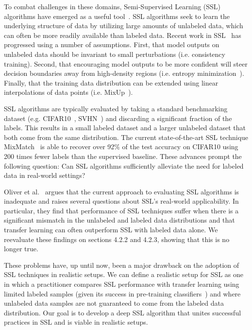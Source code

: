 \documentclass[10pt,twocolumn,letterpaper]{article}
\begin{document}
To combat challenges in these domains, Semi-Supervised Learning (SSL) algorithms have emerged as a useful tool~\cite{introsslChapelle}. SSL algorithms seek to learn the underlying structure of data by utilizing large amounts of unlabeled data, which can often be more readily available than labeled data. Recent work in SSL~\cite{mixmatchBerthelot, vatMiyato, meanteacherTarvainen, ictVerma} has progressed using a number of assumptions. First, that model outputs on unlabeled data should be invariant to small perturbations (i.e. consistency training). Second, that encouraging model outputs to be more confident will steer decision boundaries away from high-density regions (i.e. entropy minimization~\cite{entropyminsslGrandvalet}). Finally, that the training data distribution can be extended using linear interpolations of data points (i.e. MixUp~\cite{mixupZhang}).

SSL algorithms are typically evaluated by taking a standard benchmarking dataset (e.g. CIFAR10~\cite{cifar10krizhevsky}, SVHN~\cite{svhnNetzer}) and discarding a significant fraction of the labels. This results in a small labeled dataset and a larger unlabeled dataset that both come from the same distribution. The current state-of-the-art SSL technique MixMatch~\cite{mixmatchBerthelot} is able to recover over 92\% of the test accuracy on CIFAR10 using 200 times fewer labels than the supervised baseline. These advances prompt the following question: Can SSL algorithms sufficiently alleviate the need for labeled data in real-world settings?

Oliver et al.~\cite{realisticevalOliver} argues that the current approach to evaluating SSL algorithms is inadequate and raises several questions about SSL's real-world applicability. In particular, they find that performance of SSL techniques suffer when there is a significant mismatch in the unlabeled and labeled data distributions and that transfer learning can often outperform SSL with labeled data alone. We reevaluate these findings on sections 4.2.2 and 4.2.3, showing that this is no longer true.

These problems have, up until now, been a major drawback on the adoption of SSL techniques in realistic setups. We can define a realistic setup for SSL as one in which a practitioner compares SSL performance with transfer learning using limited labeled samples (given its success in pre-training classifiers~\cite{transferlearningBengio}) and where unlabeled data samples are not guaranteed to come from the labeled data distribution. Our goal is to develop a deep SSL algorithm that unites successful practices in SSL and is viable in realistic setups.
\end{document}
